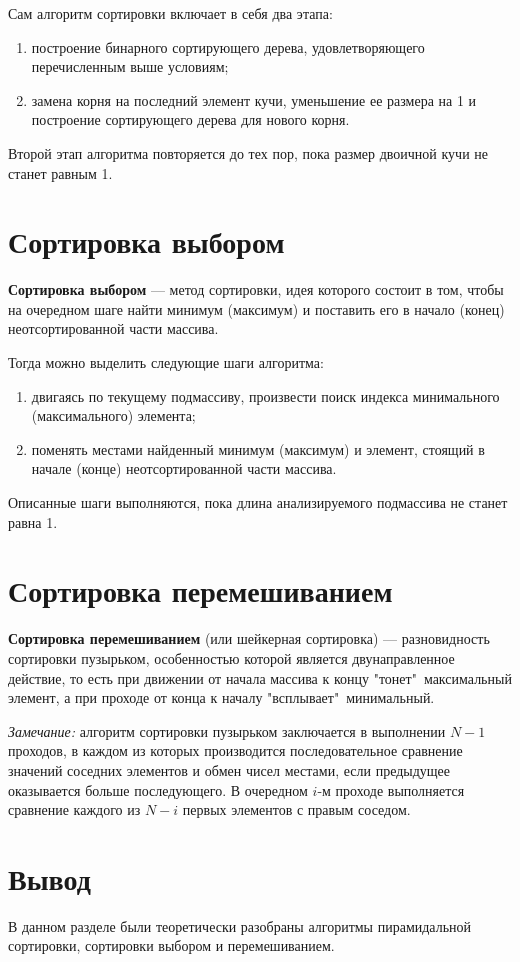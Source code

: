 Сам алгоритм сортировки включает в себя два этапа:
\begin{enumerate}[label=\arabic*)]
    \item построение бинарного сортирующего дерева, удовлетворяющего перечисленным выше условиям;
    \item замена корня на последний элемент кучи, уменьшение ее размера на 1 и построение сортирующего дерева для нового корня.
\end{enumerate}

Второй этап алгоритма повторяется до тех пор, пока размер двоичной кучи не станет равным 1.

\section{Сортировка выбором}
\textbf{Сортировка выбором} \cite{selectionsort} --- метод сортировки, идея которого состоит в том, чтобы на очередном шаге найти минимум (максимум) и поставить его в начало (конец) неотсортированной части массива.

Тогда можно выделить следующие шаги алгоритма:
\begin{enumerate}[label=\arabic*)]
    \item двигаясь по текущему подмассиву, произвести поиск индекса минимального (максимального) элемента;
    \item поменять местами найденный минимум (максимум) и элемент, стоящий в начале (конце)  неотсортированной части массива.
\end{enumerate}

Описанные шаги выполняются, пока длина анализируемого подмассива не станет равна 1.

\section{Сортировка перемешиванием}
\textbf{Сортировка перемешиванием} (или шейкерная сортировка) \cite{shakersort} --- разновидность сортировки пузырьком, особенностью которой является двунаправленное действие, то есть при движении от начала массива к концу "тонет"\ максимальный элемент, а при проходе от конца к началу "всплывает"\ минимальный.

\textit{Замечание:}
алгоритм сортировки пузырьком заключается в выполнении $N - 1$ проходов, в каждом из которых производится последовательное сравнение значений соседних элементов и обмен чисел местами, если предыдущее оказывается больше последующего. В очередном $i$-м проходе выполняется сравнение каждого из $N - i$ первых элементов с правым соседом.


\section*{Вывод}
В данном разделе были теоретически разобраны алгоритмы пирамидальной сортировки, сортировки выбором и перемешиванием.

